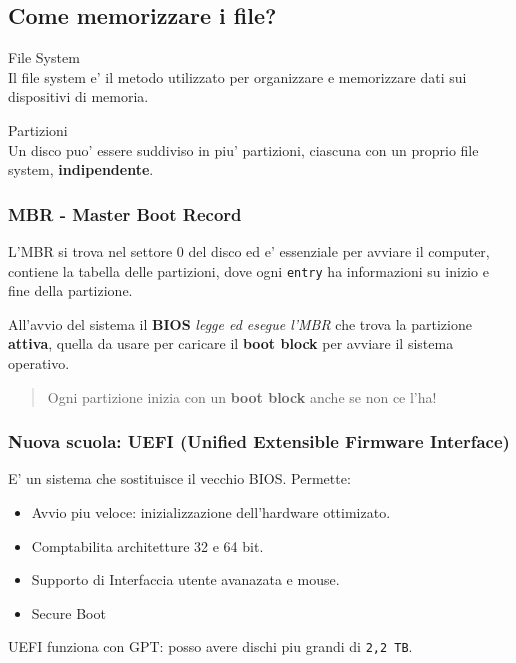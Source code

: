 \subsection{Come memorizzare i file?}
\begin{definition} File System \\
    Il file system e' il metodo utilizzato per organizzare e memorizzare dati sui dispositivi di memoria.
\end{definition}

\begin{definition} Partizioni \\
    Un disco puo' essere suddiviso in piu' partizioni, ciascuna con un proprio file system, \textbf{indipendente}.    
\end{definition}

\subsubsection{MBR - Master Boot Record}
L'MBR si trova nel settore 0 del disco ed e' essenziale per avviare il computer, contiene
la tabella delle partizioni, dove ogni \texttt{entry} ha informazioni su inizio e fine della partizione.

All'avvio del sistema il \textbf{BIOS} \textit{legge ed esegue l'MBR} che trova la partizione \textbf{attiva}, quella da usare per caricare il \textbf{boot block}
per avviare il sistema operativo.

\begin{quote}
    Ogni partizione inizia con un \textbf{boot block} anche se non ce l'ha!
\end{quote}

\subsubsection{Nuova scuola: UEFI (Unified Extensible Firmware Interface)}
E' un sistema che sostituisce il vecchio BIOS. Permette:
\begin{itemize}
    \item Avvio piu veloce: inizializzazione dell'hardware ottimizato.
    \item Comptabilita architetture 32 e 64 bit.
    \item Supporto di Interfaccia utente avanazata e mouse.
    \item Secure Boot
\end{itemize}

UEFI funziona con GPT: posso avere dischi piu grandi di \texttt{2,2 TB}.
